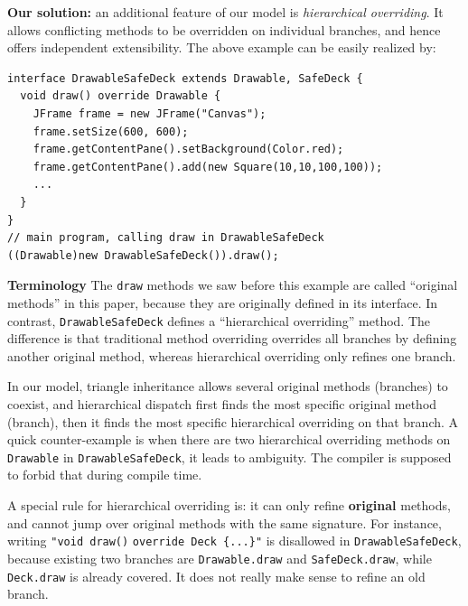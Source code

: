 \noindent\textbf{Our solution:} an additional feature of our model is \textit{hierarchical overriding}. It allows conflicting methods
to be overridden on individual branches, and hence offers independent extensibility. The above example can be easily realized by:
\vspace{3pt}\begin{lstlisting}
interface DrawableSafeDeck extends Drawable, SafeDeck {
  void draw() override Drawable {
    JFrame frame = new JFrame("Canvas");
    frame.setSize(600, 600);
    frame.getContentPane().setBackground(Color.red);
    frame.getContentPane().add(new Square(10,10,100,100));
    ...
  }
}
// main program, calling draw in DrawableSafeDeck
((Drawable)new DrawableSafeDeck()).draw(); 
\end{lstlisting}\vspace{3pt}

\textbf{Terminology} The \lstinline|draw| methods we saw before this example are called ``original methods'' in this paper, because they are originally defined in its interface.
In contrast, \lstinline|DrawableSafeDeck| defines a ``hierarchical overriding'' method. The difference is that traditional method overriding overrides all branches by defining another original method, whereas hierarchical overriding only refines one branch.

In our model, triangle inheritance allows several original methods (branches) to coexist, and hierarchical dispatch first finds the most specific original method (branch), then it finds the most specific hierarchical overriding on that branch. A quick counter-example is when there are two hierarchical overriding methods on \lstinline|Drawable| in \lstinline|DrawableSafeDeck|, it leads to ambiguity. The compiler is supposed to forbid that during compile time.

A special rule for hierarchical overriding is: it can only refine \textbf{original} methods, and cannot jump over original methods with the same signature. For instance, writing \lstinline|"void draw()| \lstinline|override Deck {...}"| is disallowed in \lstinline|DrawableSafeDeck|, because existing two branches are \lstinline|Drawable.draw| and \lstinline|SafeDeck.draw|, while \lstinline|Deck.draw| is already covered. It does not really make sense to refine an old branch.

